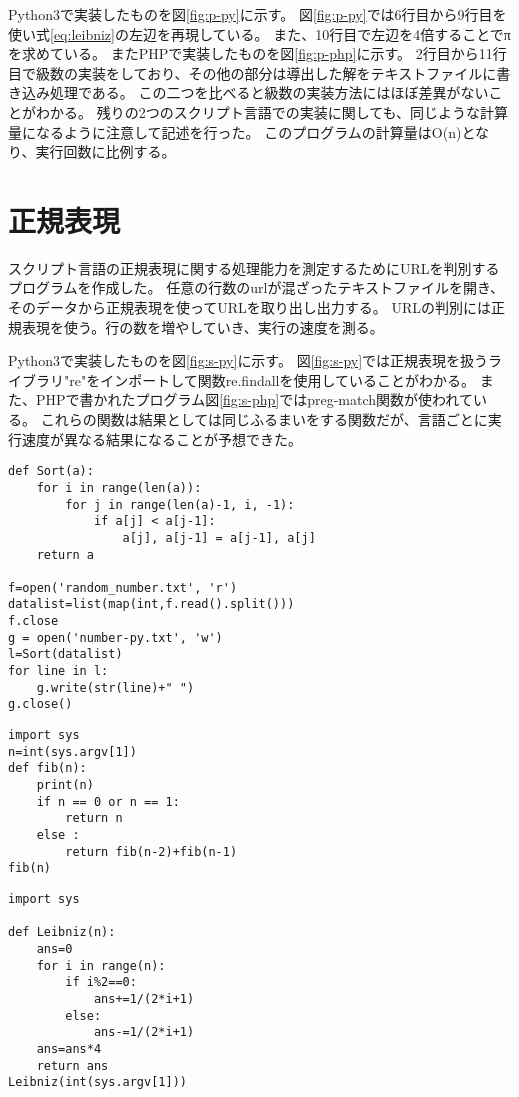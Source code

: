 Python3で実装したものを図\ref{fig:p-py}に示す。
図\ref{fig:p-py}では6行目から9行目を使い式\ref{eq:leibniz}の左辺を再現している。
また、10行目で左辺を4倍することでπを求めている。
またPHPで実装したものを図\ref{fig:p-php}に示す。
2行目から11行目で級数の実装をしており、その他の部分は導出した解をテキストファイルに書き込み処理である。
この二つを比べると級数の実装方法にはほぼ差異がないことがわかる。
残りの2つのスクリプト言語での実装に関しても、同じような計算量になるように注意して記述を行った。
このプログラムの計算量はO(n)となり、実行回数に比例する。

\section{正規表現}
スクリプト言語の正規表現に関する処理能力を測定するためにURLを判別するプログラムを作成した。
任意の行数のurlが混ざったテキストファイルを開き、そのデータから正規表現を使ってURLを取り出し出力する。
URLの判別には正規表現を使う。行の数を増やしていき、実行の速度を測る。

Python3で実装したものを図\ref{fig:s-py}に示す。
図\ref{fig:s-py}では正規表現を扱うライブラリ"re"をインポートして関数re.findallを使用していることがわかる。
また、PHPで書かれたプログラム図\ref{fig:s-php}ではpreg-match関数が使われている。
これらの関数は結果としては同じふるまいをする関数だが、言語ごとに実行速度が異なる結果になることが予想できた。

\clearpage
\begin{lstlisting}[label={fig:b-rb}, caption={Python3 バブルソート}, basicstyle=\ttfamily\footnotesize, frame=single]
def Sort(a):
    for i in range(len(a)):
        for j in range(len(a)-1, i, -1):
            if a[j] < a[j-1]:
                a[j], a[j-1] = a[j-1], a[j]
    return a

f=open('random_number.txt', 'r')
datalist=list(map(int,f.read().split()))
f.close
g = open('number-py.txt', 'w')
l=Sort(datalist)
for line in l:
    g.write(str(line)+" ")
g.close()
\end{lstlisting}

\begin{lstlisting}[label={fig:f-py}, caption={Python3 フィボナッチ数列}, basicstyle=\ttfamily\footnotesize, frame=single]
import sys
n=int(sys.argv[1])
def fib(n):
	print(n)
	if n == 0 or n == 1:
		return n
	else :
		return fib(n-2)+fib(n-1)
fib(n)
\end{lstlisting}

\clearpage

\begin{lstlisting}[label={fig:p-py}, caption={Python3 円周率の算出}, basicstyle=\ttfamily\footnotesize, frame=single]
import sys

def Leibniz(n):
    ans=0
    for i in range(n):
        if i%2==0:
            ans+=1/(2*i+1)
        else:
            ans-=1/(2*i+1)
    ans=ans*4
    return ans
Leibniz(int(sys.argv[1]))
\end{lstlisting}

